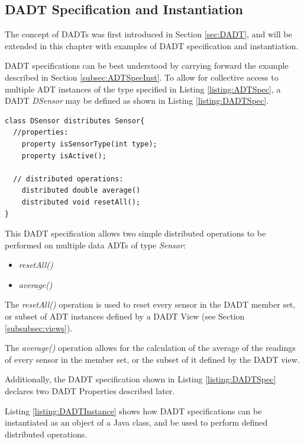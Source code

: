 \subsection{DADT Specification and Instantiation} \label{subsubsec:dadtspecandinst}

The concept of DADTs was first introduced in Section \ref{sec:DADT}, and will
be extended in this chapter with examples of DADT specification and
instantiation.

DADT specifications can be best understood by carrying forward the example
described in Section \ref{subsec:ADTSpecInst}. To allow for collective access
to multiple ADT instances of the type specified in Listing
\ref{listing:ADTSpec}, a DADT \emph{DSensor} may be defined as shown in Listing
\ref{listing:DADTSpec}.   
 
\begin{lstlisting}[frame=trbl, basewidth={0.55em, 0.6em}, captionpos=b, 
basicstyle=\ttfamily\footnotesize, breaklines, caption = Data DADT 
specification (reproduced from \cite{migliavacca_DADT:2006}), label = listing:DADTSpec]
class DSensor distributes Sensor{	
  //properties:
    property isSensorType(int type);
    property isActive();

  // distributed operations:
    distributed double average()	
    distributed void resetAll();
}
\end{lstlisting} 
 
This DADT specification allows two simple distributed operations to be performed
on multiple data ADTs of type \emph{Sensor}:  
\begin{itemize}
\item \emph{resetAll()} 
\item \emph{average()} 
\end{itemize}

The \emph{resetAll()} operation is used to reset every sensor in the DADT member
set, or subset of ADT instances defined by a DADT View (see Section
\ref{subsubsec:views}).

The \emph{average()} operation allows for the calculation of the average of the readings of every
sensor in the member set, or the subset of it defined by the DADT view.

Additionally, the DADT specification  shown in Listing \ref{listing:DADTSpec}
declares two DADT Properties described later.

Listing \ref{listing:DADTInstance} shows how DADT specifications can be
instantiated as an object of a Java class, and be used to perform defined
distributed operations.

